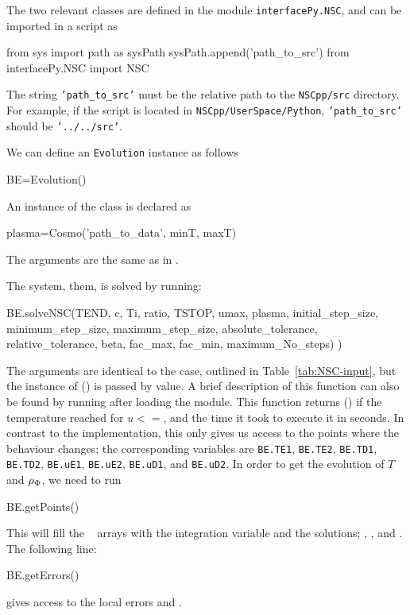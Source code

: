 \documentclass[11pt,a4paper]{article}
\begin{document}
The two relevant classes are defined in the module {\tt interfacePy.NSC}, and can be imported in a \PY script as 
%
\begin{py}
	from sys import path as sysPath
	sysPath.append('path_to_src')
	from interfacePy.NSC import NSC 
\end{py}
%
The string {\tt 'path\_to\_src'} must be the relative path to the {\tt NSCpp/src} directory. For example, if the script is located in {\tt NSCpp/UserSpace/Python}, {\tt 'path\_to\_src'} should be {\tt '../../src'}.


We can define an {\tt Evolution} instance as follows 
%
\begin{py}
	BE=Evolution()
\end{py}

An instance of the  class is declared as 
%
\begin{cpp}
	plasma=Cosmo('path_to_data', minT, maxT)
\end{cpp}
%
The arguments are the same as in \CPP.

The system, them, is solved by running:
%
\begin{cpp}
	BE.solveNSC(TEND, c, Ti, ratio, TSTOP, umax, plasma,
						initial_step_size, minimum_step_size, maximum_step_size, absolute_tolerance, 
						relative_tolerance, beta, fac_max, fac_min, maximum_No_steps)
					  )
\end{cpp}
%
The arguments are identical to the \CPP case, outlined in Table~\ref{tab:NSC-input}, but the instance of  () is passed by value. A brief description of this function can also be found by running  after loading the module. This function returns  () if the temperature reached  for $u<=$, and the time it took to execute it in seconds.
%
In contrast to the \CPP implementation, this only gives us access to the points where the behaviour changes; the corresponding variables are {\tt BE.TE1}, {\tt BE.TE2}, {\tt BE.TD1}, {\tt BE.TD2}, {\tt BE.uE1}, {\tt BE.uE2}, {\tt BE.uD1}, and {\tt BE.uD2}. In order to get the evolution of $T$ and $\rho_{\Phi}$, we need to run 
%
\begin{py}
	BE.getPoints()
\end{py}
%
This will fill the ~\cite{harris2020array} arrays with the integration variable and the solutions; , , and . The following line:
%
\begin{py}
	BE.getErrors()
\end{py}
%
gives access to the local errors  and .
\end{document}
